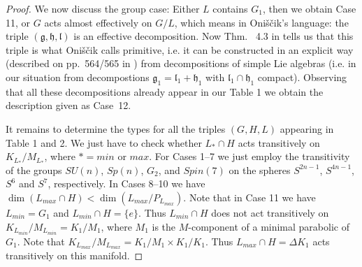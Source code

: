 \documentclass[10]{amsart}
\theoremstyle{remark}
\theoremstyle{definition}
\numberwithin{equation}{section}
\newcommand{\fg}{{\mathfrak g}}
\newcommand{\fh}{{\mathfrak h}}
\newcommand{\fl}{{\mathfrak l}}
\begin{document}
{\begin{proof}
We now discuss the group case: Either $L$ contains $G_1$, then we obtain Case 11, or $G$ acts almost effectively on $G/L$, which means in Oni\v s\v cik's language: the
triple $(\fg,\fh,\fl)$ is an effective decomposition. Now Thm.~ 4.3 in \cite{Oni69} tells us that this triple is what Oni\v s\v cik calls primitive, i.e. it can be constructed in an explicit
way (described on pp.~564/565 in \cite{Oni69}) from decompositions of simple Lie algebras (i.e. in our situation from decompostions $\fg_1=\fl_1+\fh_1$ with $\fl_1\cap\fh_1$ compact). Observing that all these decompositions
already appear in our Table 1 we obtain the description given as Case~12.

It remains to determine the types for all the triples $(G,H,L)$ appearing in Table 1 and 2. We just have to check whether $L_{*}\cap H$ acts transitively on $K_{L_*}/M_{L_*}$,
where $*=min$ or $max$. For Cases 1--7 we just employ the transitivity of the groups $SU(n)$, $Sp(n)$, $G_2$,  and $Spin(7)$ on the spheres $S^{2n-1}$, $S^{4n-1}$, $S^6$ and
$S^7$, respectively. In Cases 8--10 we have $\dim (L_{max}\cap H)<\dim (L_{max}/P_{L_{max}})$. Note that in Case 11 we have $L_{min}=G_1$ and $L_{min}\cap H =\{e\}$. Thus $L_{min}\cap H$
does not act transitively on $K_{L_{min}}/M_{L_{min}}=K_1/M_1$, where $M_1$ is the $M$-component of a minimal parabolic of $G_1$. Note that $K_{L_{max}}/M_{L_{max}}=K_1/M_1\times K_1/K_1$. Thus $L_{max}\cap H=\Delta K_1$ acts transitively on this manifold. 


\end{proof}}
\end{document}
